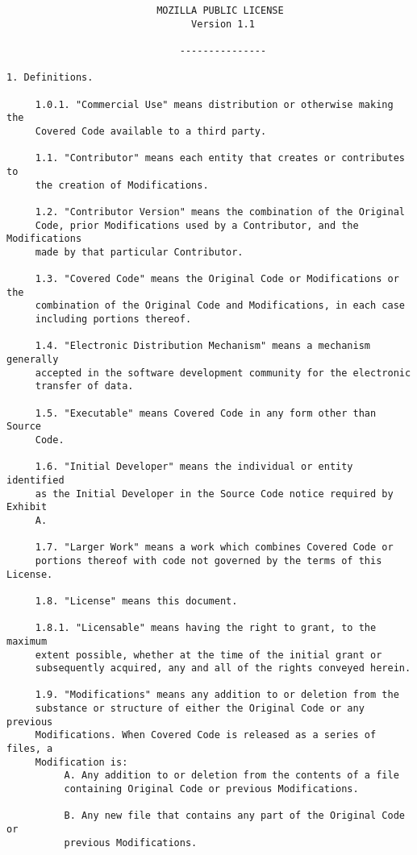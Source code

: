 \begin{verbatim}
                          MOZILLA PUBLIC LICENSE
                                Version 1.1

                              ---------------

1. Definitions.

     1.0.1. "Commercial Use" means distribution or otherwise making the
     Covered Code available to a third party.

     1.1. "Contributor" means each entity that creates or contributes to
     the creation of Modifications.

     1.2. "Contributor Version" means the combination of the Original
     Code, prior Modifications used by a Contributor, and the Modifications
     made by that particular Contributor.

     1.3. "Covered Code" means the Original Code or Modifications or the
     combination of the Original Code and Modifications, in each case
     including portions thereof.

     1.4. "Electronic Distribution Mechanism" means a mechanism generally
     accepted in the software development community for the electronic
     transfer of data.

     1.5. "Executable" means Covered Code in any form other than Source
     Code.

     1.6. "Initial Developer" means the individual or entity identified
     as the Initial Developer in the Source Code notice required by Exhibit
     A.

     1.7. "Larger Work" means a work which combines Covered Code or
     portions thereof with code not governed by the terms of this License.

     1.8. "License" means this document.

     1.8.1. "Licensable" means having the right to grant, to the maximum
     extent possible, whether at the time of the initial grant or
     subsequently acquired, any and all of the rights conveyed herein.

     1.9. "Modifications" means any addition to or deletion from the
     substance or structure of either the Original Code or any previous
     Modifications. When Covered Code is released as a series of files, a
     Modification is:
          A. Any addition to or deletion from the contents of a file
          containing Original Code or previous Modifications.

          B. Any new file that contains any part of the Original Code or
          previous Modifications.


\end{verbatim}
